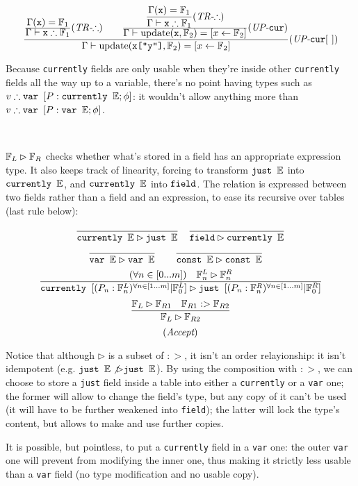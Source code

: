 $$\frac
{
          \frac
              {\displaystyle \Gamma(\texttt{x}) = \mathbb{F}_1}
              {\displaystyle \Gamma\vdash \texttt{x} \therefore \mathbb{F}_1}
              (\textit{TR-$\therefore$})
    \qquad
    \frac
        {\displaystyle
          \frac
              {\displaystyle \Gamma(\texttt{x}) = \mathbb{F}_1}
              {\displaystyle \Gamma\vdash \texttt{x} \therefore \mathbb{F}_1}
              (\textit{TR-$\therefore$})
        }
        {\displaystyle \Gamma\vdash\textrm{update}(\texttt{x}, \mathbb{F}_2) = [x\leftarrow \mathbb{F}_2]}
        (\textit{UP-{\tt cur}})
}
{ \Gamma\vdash\textrm{update}(\texttt{x["y"]}, \mathbb{F}_2) = [x\leftarrow\mathbb{F}_2] }
(\textit{UP-{\tt cur}$[\ ]$})
$$

Because \verb+currently+ fields are only usable when they're inside
other \verb+currently+ fields all the way up to a variable, there's no
point having types such as $v \therefore \texttt{var }[P:\texttt{currently }\mathbb{E}; \phi]$: it
wouldn't allow anything more than $v \therefore \texttt{var }[P:\texttt{var }\mathbb{E}; \phi]$.

~

$\mathbb{F}_L \rhd \mathbb{F}_R$ checks whether what's stored in a field has an
appropriate expression type. It also keeps track of linearity, forcing
to transform $\texttt{just }\mathbb{E}$ into $\texttt{currently }\mathbb{E}$, and $\texttt{currently }\mathbb{E}$ into $\texttt{field}$. The
relation is expressed between two fields rather than a field and an
expression, to ease its recursive over tables (last rule below):

$$
\frac  {}  {\C\T E \rhd \J\T E}
%
\quad
%
\frac  {}  {\F \rhd \C\T E}
$$
$$
\frac  { }  {\V\T E \rhd \V\T E}
%
\qquad
%
\frac  { }  {\K\T E \rhd \K\T E}
%
\quad
%
$$
$$
\frac
{(\forall n\in[0...m]) \quad \mathbb{F}_n^L \rhd \mathbb{F}_n^R}
{
\texttt{currently }[(P_n:\mathbb{F}_n^L)^{\forall n\in[1...m]}|\mathbb{F}_0^L]
\rhd
\texttt{just }[(P_n:\mathbb{F}_n^R)^{\forall n\in[1...m]}|\mathbb{F}_0^R]
}
$$
$$
\frac
    {\mathbb{F}_L \rhd \mathbb{F}_{R1} \quad \mathbb{F}_{R1} :> \mathbb{F}_{R2}}
    {\mathbb{F}_L \rhd \mathbb{F}_{R2}}
$$
$$(\textit{Accept})$$

Notice that although $\rhd$ is a subset of $:>$, it isn't an order
relayionship: it isn't idempotent (e.g. $\texttt{just }\mathbb{E}\not\rhd\texttt{just }\mathbb{E}$). By
using the composition with $:>$, we can choose to store a \verb+just+
field inside a table into either a \verb+currently+ or a \verb+var+
one; the former will allow to change the field's type, but any copy of
it can't be used (it will have to be further weakened into
\verb+field+); the latter will lock the type's content, but allows to
make and use further copies.

It is possible, but pointless, to put a \verb+currently+ field in a
\verb+var+ one: the outer \verb+var+ one will prevent from modifying
the inner one, thus making it strictly less usable than a \verb+var+
field (no type modification and no usable copy).

